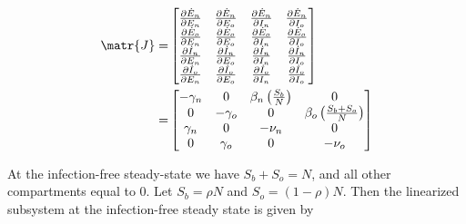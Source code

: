 \documentclass[11pt]{article}
\begin{document}
\begin{align*}
	\matr{J} =&
	\begin{bmatrix}
		\frac{\partial \dot{E}_n}{\partial E_n} & 	\frac{\partial \dot{E}_n}{\partial E_o} & 	\frac{\partial \dot{E}_n}{\partial I_n} & 	\frac{\partial \dot{E}_n}{\partial I_o} \\
		\frac{\partial \dot{E}_o}{\partial E_n} & 	\frac{\partial \dot{E}_o}{\partial E_o} & 	\frac{\partial \dot{E}_o}{\partial I_n} & 	\frac{\partial \dot{E}_o}{\partial I_o}\\
		\frac{\partial \dot{I}_n}{\partial E_n} & 	\frac{\partial \dot{I}_n}{\partial E_o} & 	\frac{\partial \dot{I}_n}{\partial I_n} & 	\frac{\partial \dot{I}_n}{\partial I_o}\\
		\frac{\partial \dot{I}_o}{\partial E_n} & 	\frac{\partial \dot{I}_o}{\partial E_o} & 	\frac{\partial \dot{I}_o}{\partial I_n} & 	\frac{\partial \dot{I}_o}{\partial I_o}\\
	 \end{bmatrix}\\
	 =&
	\begin{bmatrix}
		-\gamma_n &	0	&	\beta_n \left( \frac{S_b}{N} \right) & 	0 \\
		0 & 	-\gamma_o & 0 & \beta_o \left( \frac{S_b + S_o}{N} \right)\\
		\gamma_n & 0 & 	-\nu_n &		0	\\
		0 & 	\gamma_o & 	0 & -\nu_o \\
	 \end{bmatrix}
\end{align*}

At the infection-free steady-state we have \( S_b + S_o = N \), and all other compartments equal to 0.
Let \( S_b = \rho N \) and \( S_o = (1 - \rho) N \).
Then the linearized subsystem at the infection-free steady state is given by
\end{document}
